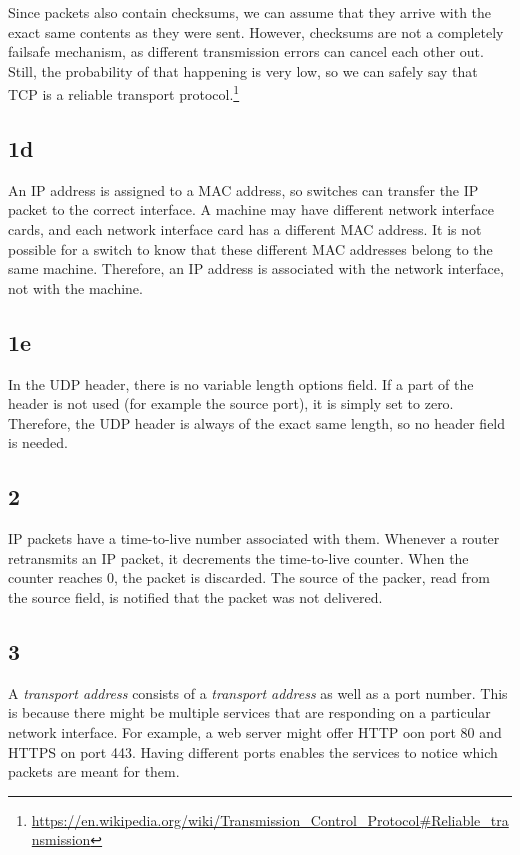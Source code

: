 \documentclass[a4paper]{article}
\begin{document}
Since packets also contain checksums, we can assume that they arrive with the exact same contents as they were sent. However, checksums are not a completely failsafe mechanism, as different transmission errors can cancel each other out. Still, the probability of that happening is very low, so we can safely say that TCP is a reliable transport protocol.\footnote{\url{https://en.wikipedia.org/wiki/Transmission_Control_Protocol#Reliable_transmission}}


\subsection{1d}

An IP address is assigned to a MAC address, so switches can transfer the IP packet to the correct interface. A machine may have different network interface cards, and each network interface card has a different MAC address. It is not possible for a switch to know that these different MAC addresses belong to the same machine. Therefore, an IP address is associated with the network interface, not with the machine.

\subsection{1e}

In the UDP header, there is no variable length options field. If a part of the header is not used (for example the source port), it is simply set to zero. Therefore, the UDP header is always of the exact same length, so no header field is needed.

\subsection{2}

IP packets have a time-to-live number associated with them. Whenever a router retransmits an IP packet, it decrements the time-to-live counter. When the counter reaches 0, the packet is discarded. The source of the packer, read from the source field, is notified that the packet was not delivered.

\subsection{3}

A \textit{transport address} consists of a \textit{transport address} as well as a port number. This is because there might be multiple services that are responding on a particular network interface. For example, a web server might offer HTTP oon port 80 and HTTPS on port 443. Having different ports enables the services to notice which packets are meant for them.
\end{document}
